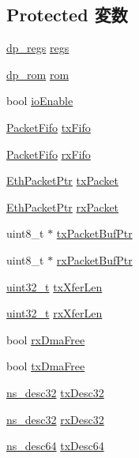 \subsection*{Protected 変数}
\begin{DoxyCompactItemize}
\item 
\hyperlink{structdp__regs}{dp\_\-regs} \hyperlink{classNSGigE_aa13c4990b00db93a4f26917bec406c92}{regs}
\item 
\hyperlink{structdp__rom}{dp\_\-rom} \hyperlink{classNSGigE_a56884429a3cfe131301fcb7d0e69394a}{rom}
\item 
bool \hyperlink{classNSGigE_aa337c19334056d05e7cf8c485ca8414a}{ioEnable}
\item 
\hyperlink{classPacketFifo}{PacketFifo} \hyperlink{classNSGigE_ae699c324753236e0a59aa2465920eb46}{txFifo}
\item 
\hyperlink{classPacketFifo}{PacketFifo} \hyperlink{classNSGigE_a45c9c6a3665bcd91e57ff35aa9089fa7}{rxFifo}
\item 
\hyperlink{classRefCountingPtr}{EthPacketPtr} \hyperlink{classNSGigE_a8d22e1a154942ff0d4ab9048e7e844bb}{txPacket}
\item 
\hyperlink{classRefCountingPtr}{EthPacketPtr} \hyperlink{classNSGigE_a86803aea746d627b1e3fd8690451038a}{rxPacket}
\item 
uint8\_\-t $\ast$ \hyperlink{classNSGigE_a0481aba8937a430f506612cbe987eb03}{txPacketBufPtr}
\item 
uint8\_\-t $\ast$ \hyperlink{classNSGigE_a0b53c16e0701c1cfceaef44b66586937}{rxPacketBufPtr}
\item 
\hyperlink{Type_8hh_a435d1572bf3f880d55459d9805097f62}{uint32\_\-t} \hyperlink{classNSGigE_a2b5ee5cdd15e5dc9250023f6e0b56810}{txXferLen}
\item 
\hyperlink{Type_8hh_a435d1572bf3f880d55459d9805097f62}{uint32\_\-t} \hyperlink{classNSGigE_a4adabe285146911e77698a9d405ef3b5}{rxXferLen}
\item 
bool \hyperlink{classNSGigE_ac5da2b90c6468f1f5f85404aab8fd314}{rxDmaFree}
\item 
bool \hyperlink{classNSGigE_a5cda9472c6a37cb671af71d4196e0f80}{txDmaFree}
\item 
\hyperlink{structns__desc32}{ns\_\-desc32} \hyperlink{classNSGigE_a6002ce8597c7299cd50223ef34c88b2f}{txDesc32}
\item 
\hyperlink{structns__desc32}{ns\_\-desc32} \hyperlink{classNSGigE_a9c135674cce636c948f5ac5e732d1b2e}{rxDesc32}
\item 
\hyperlink{structns__desc64}{ns\_\-desc64} \hyperlink{classNSGigE_a617a181e3d109f5a02baf11f4d9464c8}{txDesc64}

\end{DoxyCompactItemize}
